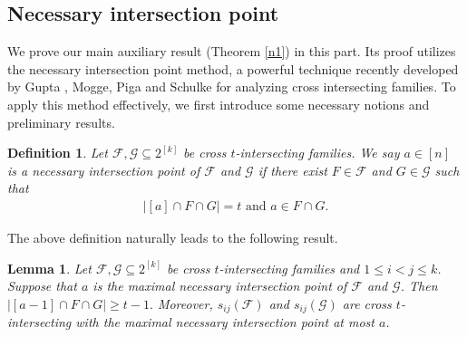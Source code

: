 \documentclass[11pt]{article}
\newtheorem{lemma}[theorem]{Lemma}
\newtheorem{definition}[theorem]{Definition}
\begin{document}
\subsection{Necessary intersection point}

We prove our main auxiliary result (Theorem \ref{n1}) in this part. Its proof utilizes the necessary intersection point method, a powerful technique recently developed by Gupta , Mogge, Piga and Schulke \cite{G23} for analyzing cross intersecting families. 
To apply this method effectively, we first introduce some necessary notions and preliminary results.


\begin{definition}
    Let $\mathcal{F}, \mathcal{G} \subseteq 2^{[k]}$ be cross $t$-intersecting families.  We say $a \in[n]$ is a \textit{necessary intersection point} of $\mathcal{F}$ and $ \mathcal{G}$ if there exist  $F \in \mathcal{F}$ and $ G  \in \mathcal{G} $ such that
    \begin{align*}
    \left|[a] \cap F\cap G\right|=t \text { and } a \in F\cap G.
    \end{align*}
\end{definition}

The above definition naturally leads to the following result.

 \begin{lemma}\label{34}
      Let $\mathcal{F}, \mathcal{G} \subseteq 2^{[k]}$ be cross $t$-intersecting families and $1\le i< j\le k$. Suppose that $a$ is the maximal necessary intersection point of $\mathcal{F}$ and $ \mathcal{G}$. Then 
      $
       \left|[a-1] \cap F\cap G\right|\ge t-1.
      $
 Moreover, $s_{ij}(\mathcal{F})$ and $ s_{ij}(\mathcal{G})$ are  cross $t$-intersecting with the maximal necessary intersection point at most $a$. 
 \end{lemma}
\end{document}
